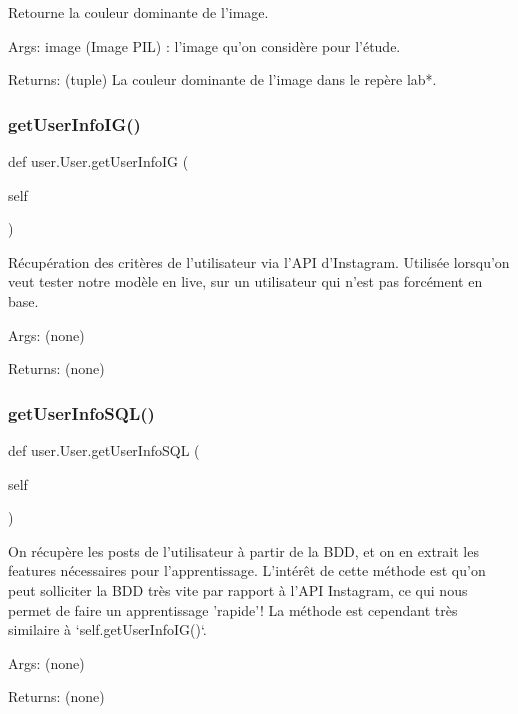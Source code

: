 \begin{DoxyVerb}Retourne la couleur dominante de l'image.

Args:
        image (Image PIL) : l'image qu'on considère pour l'étude.

Returns:
        (tuple) La couleur dominante de l'image dans le repère lab*.
\end{DoxyVerb}
 \mbox{\label{classuser_1_1_user_a7dfe5ca7988fd34b0c801742a5aa84e6}} 
\subsubsection{\texorpdfstring{get\+User\+Info\+I\+G()}{getUserInfoIG()}}
{\footnotesize\ttfamily def user.\+User.\+get\+User\+Info\+IG (\begin{DoxyParamCaption}\item[{}]{self }\end{DoxyParamCaption})}

\begin{DoxyVerb}Récupération des critères de l'utilisateur via l'API d'Instagram.
Utilisée lorsqu'on veut tester notre modèle en live, sur un utilisateur qui n'est pas forcément en base.

Args:
(none)

Returns:
(none)
\end{DoxyVerb}
 \mbox{\label{classuser_1_1_user_a5b18648f492550fba80fd13478888d1d}} 
\subsubsection{\texorpdfstring{get\+User\+Info\+S\+Q\+L()}{getUserInfoSQL()}}
{\footnotesize\ttfamily def user.\+User.\+get\+User\+Info\+S\+QL (\begin{DoxyParamCaption}\item[{}]{self }\end{DoxyParamCaption})}

\begin{DoxyVerb}On récupère les posts de l'utilisateur à partir de la BDD, et on en extrait les features nécessaires pour l'apprentissage.
L'intérêt de cette méthode est qu'on peut solliciter la BDD très vite par rapport à l'API Instagram, ce qui nous permet de faire un
apprentissage 'rapide'!
La méthode est cependant très similaire à `self.getUserInfoIG()`.

Args:
        (none)

Returns:
        (none)
\end{DoxyVerb}
 \mbox{\label{classuser_1_1_user_a09bf41f6ea57ec2ce77fa616738d08bc}} 
